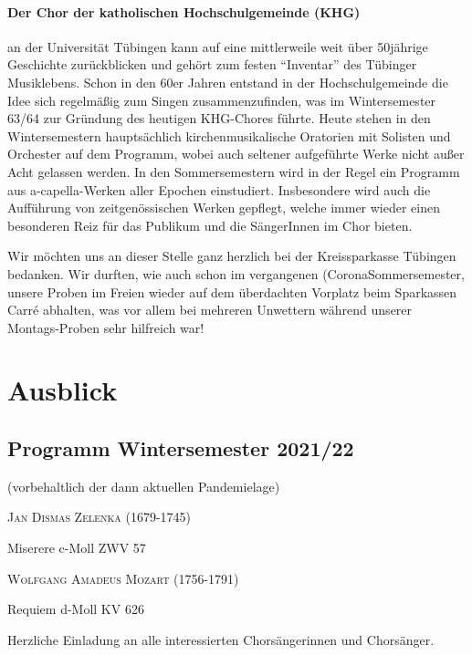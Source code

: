 \documentclass[a5paper,twoside,fontsize=11pt]{scrartcl}
\newcommand{\komponist}[1]{\textsc{\large #1}}
\newcommand{\werk}[1]{{\large #1}}
\begin{document}
\paragraph{Der Chor der katholischen Hochschulgemeinde (KHG)} an der Universität Tübingen kann auf eine mittlerweile weit über 50jährige Geschichte zurückblicken und gehört zum festen \enquote{Inventar} des Tübinger Musiklebens.
Schon in den 60er Jahren entstand in der Hochschulgemeinde die Idee sich regelmäßig zum Singen zusammenzufinden, was im Wintersemester 63/64 zur Gründung des heutigen KHG-Chores führte.
Heute stehen in den Wintersemestern hauptsächlich kirchenmusikalische Oratorien mit Solisten und Orchester auf dem Programm, wobei auch seltener aufgeführte Werke nicht außer Acht gelassen werden.
In den Sommersemestern wird in der Regel ein Programm aus a-capella-Werken aller Epochen einstudiert.
Insbesondere wird auch die Aufführung von zeitgenössischen Werken gepflegt, welche immer wieder einen besonderen Reiz für das Publikum und die SängerInnen im Chor bieten.

\bigskip

\noindent Wir möchten uns an dieser Stelle ganz herzlich bei der Kreissparkasse Tübingen bedanken.
Wir durften, wie auch schon im vergangenen (Corona\discretionary{-)}{}{-)}Sommer\-semester, unsere Proben im Freien wieder auf dem überdachten Vorplatz beim Sparkassen Carré abhalten, was vor allem bei mehreren Unwettern während unserer Montags-Proben sehr hilfreich war!

\newpage
{}
\section*{Ausblick}
\subsection*{Programm Wintersemester 2021/22}
(vorbehaltlich der dann aktuellen Pandemielage)
\begin{center}
    \begin{minipage}{\widthof{\komponist{Wolfgang Amadeus Mozart (1756-1791) }}}
        \komponist{Jan Dismas Zelenka (1679-1745)}
        \vspace{0.8ex}
        
        \werk{Miserere c-Moll ZWV 57}
        \vspace{2.5ex}
        
        \komponist{Wolfgang Amadeus Mozart (1756-1791)}
        \vspace{0.8ex}
        
        \werk{Requiem d-Moll KV 626}
    \end{minipage}
\end{center}
\vspace{1ex}
\noindent Herzliche Einladung an alle interessierten Chorsängerinnen und Chorsänger.
\end{document}
